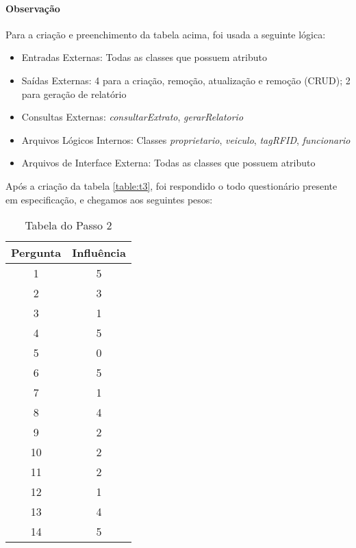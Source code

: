 \documentclass[
10pt, %
a4paper, %
oneside, %
headinclude,footinclude, %
BCOR5mm, %
]{scrartcl}
\begin{document}
\paragraph{Observação} Para a criação e preenchimento da tabela acima, foi
usada a seguinte lógica:
\begin{itemize}[noitemsep]
	\item Entradas Externas: Todas as classes que possuem atributo
	\item Saídas Externas: 4 para a criação, remoção, atualização e remoção (CRUD); 2 para geração de relatório
	\item Consultas Externas: \textit{consultarExtrato}, \textit{gerarRelatorio}
	\item Arquivos Lógicos Internos: Classes \textit{proprietario}, \textit{veiculo}, \textit{tagRFID}, \textit{funcionario}
	\item Arquivos de Interface Externa: Todas as classes que possuem atributo
\end{itemize}

\newpage %

Após a criação da tabela \ref{table:t3}, foi respondido o todo questionário
presente em especificação, e chegamos aos seguintes pesos:
\begin{table}[!h]
	\centering
	\begin{tabular}{c c}
		\hline\hline
		Pergunta & Influência\\ 
		\hline\hline 
		1 & 5\\ 
		\hline
		2 & 3\\ 
		\hline
		3 & 1\\ 
		\hline
		4 & 5\\ 
		\hline
		5 & 0\\ 
		\hline
		6 & 5\\ 
		\hline
		7 & 1\\ 
		\hline
		8 & 4\\ 
		\hline
		9 & 2\\ 
		\hline
		10 & 2\\ 
		\hline
		11 & 2\\ 
		\hline
		12 & 1\\ 
		\hline
		13 & 4\\ 
		\hline
		14 & 5\\ 
		\hline
	\hline\end{tabular}
	\caption{\small{Tabela do Passo 2}} 
	\label{table:t4}
\end{table}
\end{document}
